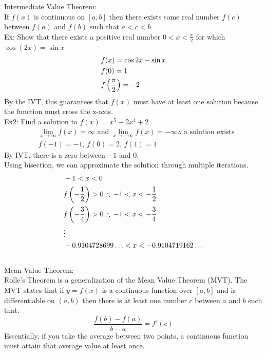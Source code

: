 \documentclass[11pt, fleqn]{article}
\begin{document}
Intermediate Value Theorem:\\
If $f(x)$ is continuous on $[a,b]$ then there exists some real number $f(c)$ between $f(a)$ and $f(b)$ such that $a<c<b$\\
Ex: Show that there exists a positive real number $0<x<\frac{\pi}{2}$ for which $\cos(2x)=\sin x$
\begin{align*}
    &f(x)=\cos 2x-\sin x\\
    &f(0)=1\\
    &f\left( \frac{\pi}{2} \right)=-2
\end{align*}
By the IVT, this guarantees that $f(x)$ must have at least one solution because the function must cross the x-axis.\\
Ex2: Find a solution to $f(x)=x^5-2x^4+2$
\begin{align*}
    &\lim_{x\to\infty}f(x)=\infty\text{ and }\lim_{x\to-\infty}f(x)=-\infty\therefore\text{ a solution exists}\\
    &f(-1)=-1,\,f(0)=2,\,f(1)=1
\end{align*}
By IVT, there is a zero between $-1$ and 0.\\
Using bisection, we can approximate the solution through multiple iterations.
\begin{align*}
    &-1<x<0\\
    &f\left( -\frac{1}{2} \right)>0\therefore\,-1<x<-\frac{1}{2}\\
    &f\left( -\frac{3}{4} \right)>0\therefore\,-1<x<-\frac{3}{4}\\
    &\vdots\\
    &-0.9104728699\ldots<x<-0.9104719162\ldots
\end{align*}
\\
Mean Value Theorem:\\
Rolle's Theorem is a generalization of the Mean Value Theorem (MVT). The MVT states that if $y=f(x)$ is a continuous function over $[a,b]$ and is differentiable on $(a,b)$ then there is at least one number $c$ between $a$ and $b$ such that:
$$\frac{f(b)-f(a)}{b-a}=f'(c)$$
Essentially, if you take the average between two points, a continuous function must attain that average value at least once.\\
\end{document}
